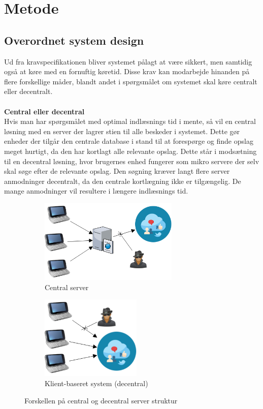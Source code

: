 \section{Metode}
\subsection{Overordnet system design}
Ud fra kravspecifikationen bliver systemet pålagt at være sikkert, men samtidig også at køre med en fornuftig køretid. Disse krav kan  modarbejde hinanden på flere forskellige måder, blandt andet i spørgsmålet om systemet skal køre centralt eller decentralt.
\\\\
\textbf{Central eller decentral}\\
Hvis man har spørgsmålet med optimal indlæsnings tid i mente, så vil en central løsning med en server der lagrer stien til alle beskeder i systemet. Dette gør enheder der tilgår den centrale database i stand til at forespørge og finde opslag meget hurtigt, da den har kortlagt alle relevante opslag. Dette står i modsætning til en decentral løsning, hvor brugernes enhed fungerer som mikro servere der selv skal søge efter de relevante opslag. Den søgning kræver langt flere server anmodninger decentralt, da den centrale kortlægning ikke er tilgængelig. De mange anmodninger vil resultere i længere indlæsnings tid.

\begin{figure}[H]
    \begin{subfigure}{0.5\textwidth}
        \centering
        \includegraphics[width=1\linewidth, height=4cm]{Projectdoc/Assets/Illustrationer/Security_diagram_1.png} 
        \caption{Central server}
        \label{fig:central_server}
    \end{subfigure}
    \begin{subfigure}{0.5\textwidth}
        \centering
        \includegraphics[width=0.7\linewidth, height=4cm]{Projectdoc/Assets/Illustrationer/Security_diagram_2.png}
        \caption{Klient-baseret system (decentral)}
        \label{fig:decentral_server}
    \end{subfigure}
    \caption{Forskellen på central og decentral server struktur}
    \label{fig:serverstruktur}
\end{figure}

